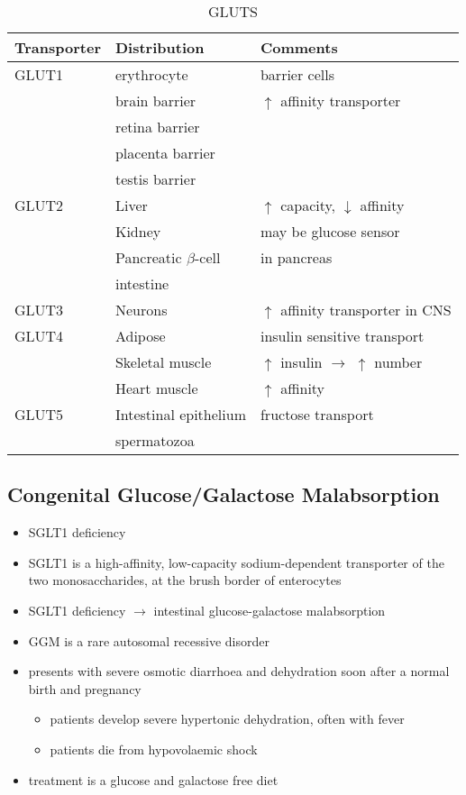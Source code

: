 \documentclass{scrartcl}
\begin{document}
\begin{table}[htbp]
\caption[GLUTS]{\label{tab:org9c326bf}
GLUTS}
\centering
\begin{tabular}{lll}
Transporter & Distribution & Comments\\
\hline
GLUT1 & erythrocyte & barrier cells\\
 & brain barrier & \(\uparrow\) affinity transporter\\
 & retina barrier & \\
 & placenta barrier & \\
 & testis barrier & \\
\hline
GLUT2 & Liver & \(\uparrow\) capacity, \(\downarrow\) affinity\\
 & Kidney & may be glucose sensor\\
 & Pancreatic \(\beta\)-cell & in pancreas\\
 & intestine & \\
\hline
GLUT3 & Neurons & \(\uparrow\) affinity  transporter in CNS\\
\hline
GLUT4 & Adipose & insulin sensitive transport\\
 & Skeletal muscle & \(\uparrow\) insulin \(\to\) \(\uparrow\) number\\
 & Heart muscle & \(\uparrow\) affinity\\
\hline
GLUT5 & Intestinal epithelium & fructose transport\\
 & spermatozoa & \\
\end{tabular}
\end{table}

\subsection{Congenital Glucose/Galactose Malabsorption}
\label{sec:org790839b}
\begin{itemize}
\item SGLT1 deficiency
\item SGLT1 is a high-affinity, low-capacity sodium-dependent transporter
of the two monosaccharides, at the brush border of enterocytes
\item SGLT1 deficiency \(\to\) intestinal glucose-galactose malabsorption
\item GGM is a rare autosomal recessive disorder
\item presents with severe osmotic diarrhoea and dehydration soon after a
normal birth and pregnancy
\begin{itemize}
\item patients develop severe hypertonic dehydration, often with fever
\item patients die from hypovolaemic shock
\end{itemize}
\item treatment is a glucose and galactose free diet
\end{itemize}
\end{document}
